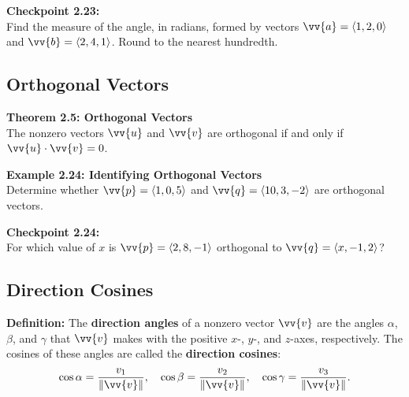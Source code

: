 \documentclass{article}
\begin{document}
\begin{exercisebox}
    \textbf{Checkpoint 2.23:} \\
    Find the measure of the angle, in radians, formed by vectors \(\vv{a} = \langle 1, 2, 0 \rangle\) and \(\vv{b} = \langle 2, 4, 1 \rangle\). Round to the nearest hundredth.
\end{exercisebox}

\subsection*{Orthogonal Vectors}

\begin{theorembox}
    \textbf{Theorem 2.5: Orthogonal Vectors} \\
    The nonzero vectors \(\vv{u}\) and \(\vv{v}\) are orthogonal if and only if \(\vv{u} \cdot \vv{v} = 0\).
\end{theorembox}

\begin{examplebox}
    \textbf{Example 2.24: Identifying Orthogonal Vectors} \\
    Determine whether \(\vv{p} = \langle 1, 0, 5 \rangle\) and \(\vv{q} = \langle 10, 3, -2 \rangle\) are orthogonal vectors.
\end{examplebox}

\begin{exercisebox}
    \textbf{Checkpoint 2.24:} \\
    For which value of \(x\) is \(\vv{p} = \langle 2, 8, -1 \rangle\) orthogonal to \(\vv{q} = \langle x, -1, 2 \rangle\)?
\end{exercisebox}

\subsection*{Direction Cosines}

\begin{definitionbox}
    \textbf{Definition:} The \textbf{direction angles} of a nonzero vector \(\vv{v}\) are the angles \(\alpha\), \(\beta\), and \(\gamma\) that \(\vv{v}\) makes with the positive \(x\)-, \(y\)-, and \(z\)-axes, respectively. The cosines of these angles are called the \textbf{direction cosines}:
    \[
    \cos \alpha = \frac{v_1}{\|\vv{v}\|}, \quad \cos \beta = \frac{v_2}{\|\vv{v}\|}, \quad \cos \gamma = \frac{v_3}{\|\vv{v}\|}.
    \]
\end{definitionbox}
\end{document}
